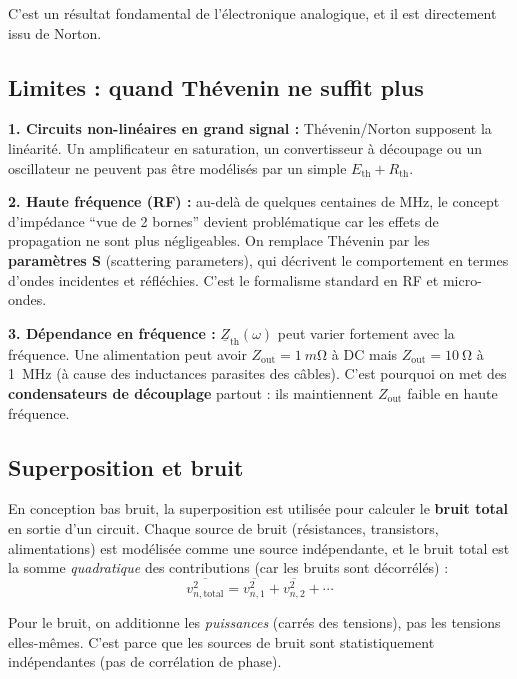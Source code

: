 \documentclass[12pt,a4paper,twoside]{book}
\begin{document}
C'est un résultat fondamental de l'électronique analogique, et il est directement issu de Norton.

\subsection{Limites : quand Thévenin ne suffit plus}

\begin{attention}
\textbf{1. Circuits non-linéaires en grand signal :} Thévenin/Norton supposent la linéarité. Un amplificateur en saturation, un convertisseur à découpage ou un oscillateur ne peuvent pas être modélisés par un simple $E_{\text{th}} + R_{\text{th}}$.

\textbf{2. Haute fréquence (RF) :} au-delà de quelques centaines de MHz, le concept d'impédance ``vue de 2 bornes'' devient problématique car les effets de propagation ne sont plus négligeables. On remplace Thévenin par les \textbf{paramètres S} (scattering parameters), qui décrivent le comportement en termes d'ondes incidentes et réfléchies. C'est le formalisme standard en RF et micro-ondes.

\textbf{3. Dépendance en fréquence :} $\underline{Z}_{\text{th}}(\omega)$ peut varier fortement avec la fréquence. Une alimentation peut avoir $Z_{\text{out}} = \SI{1}{m\ohm}$ à DC mais $Z_{\text{out}} = \SI{10}{\ohm}$ à \SI{1}{MHz} (à cause des inductances parasites des câbles). C'est pourquoi on met des \textbf{condensateurs de découplage} partout : ils maintiennent $Z_{\text{out}}$ faible en haute fréquence.
\end{attention}

\subsection{Superposition et bruit}

En conception bas bruit, la superposition est utilisée pour calculer le \textbf{bruit total} en sortie d'un circuit. Chaque source de bruit (résistances, transistors, alimentations) est modélisée comme une source indépendante, et le bruit total est la somme \textit{quadratique} des contributions (car les bruits sont décorrélés) :
\[
\overline{v_{n,\text{total}}^2} = \overline{v_{n,1}^2} + \overline{v_{n,2}^2} + \cdots
\]

\begin{attention}
Pour le bruit, on additionne les \textit{puissances} (carrés des tensions), pas les tensions elles-mêmes. C'est parce que les sources de bruit sont statistiquement indépendantes (pas de corrélation de phase).
\end{attention}
\end{document}
